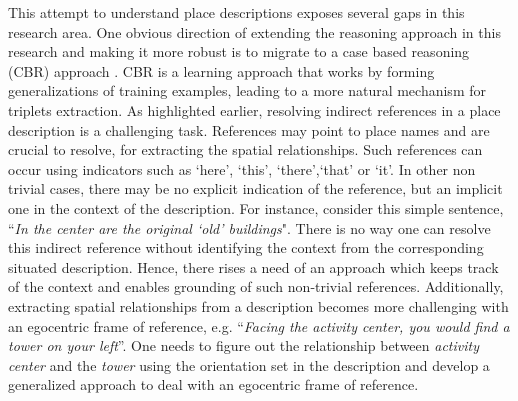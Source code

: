 \documentclass{acm_proc_article-sp}
\begin{document}
This attempt to understand place descriptions exposes several gaps in this research area. One obvious direction of extending the reasoning approach in this research and making it more robust is to migrate to a case based reasoning (CBR) approach \cite{xu:case}. CBR is a learning approach that works by forming generalizations of training examples, leading to a more natural mechanism for triplets extraction. As highlighted earlier, resolving indirect references in a place description is a challenging task. References may point to place names and are crucial to resolve, for extracting the spatial relationships. Such references can occur using indicators such as `here', `this', `there',`that' or `it'. In other non trivial cases, there may be no explicit indication of the reference, but an implicit one in the context of the description. For instance, consider this simple sentence, ``\textit{In the center are the original `old' buildings}". There is no way one can resolve this indirect reference without identifying the context from the corresponding situated description. Hence, there rises a need of an approach which keeps track of the context and enables grounding of such non-trivial references. Additionally, extracting spatial relationships from a description becomes more challenging with an egocentric frame of reference, e.g. ``\textit{Facing the activity center, you would find a tower on your left}''. One needs to figure out the relationship between \textit{activity center} and the \textit{tower} using the orientation set in the description and develop a generalized approach to deal with an egocentric frame of reference.


%
%
\end{document}
